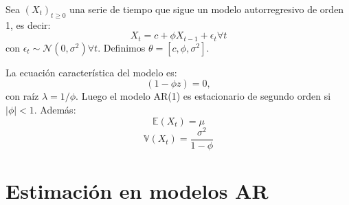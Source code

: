 \begin{example}
Sea $(X_t)_{t\geq0}$ una serie de tiempo que sigue un modelo autorregresivo de orden 1, es decir: 
$$
X_t=c+\phi X_{t-1} + \epsilon_t \forall t
$$
con $\epsilon_t \sim  \mathcal{N}(0,\sigma^2) \forall t $. Definimos $\theta= [c, \phi, \sigma^{2} ]$. 

La ecuación característica del modelo es: 
$$
(1-\phi z)=0,
$$
con raíz $\lambda=1/\phi$. Luego el modelo AR(1) es estacionario de segundo orden si $|\phi|<1$. Además:
$$
\mathbb{E}(X_t)=\mu
$$
$$
\mathbb{V}(X_t)=\dfrac{\sigma^{2}}{1-\phi} 
$$
\end{example}

\section{Estimación en modelos AR}

